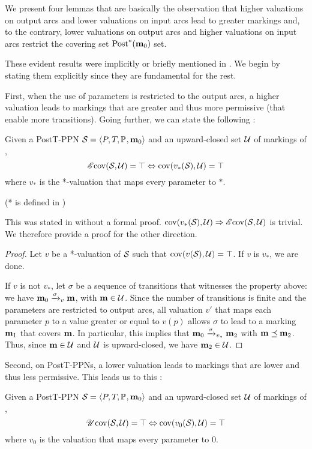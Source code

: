 
We present four lemmas that are basically the observation that
higher valuations on output arcs and lower valuations on input arcs lead to greater markings and, to the contrary,
lower valuations on output arcs and higher valuations on input arcs restrict the covering set $\operatorname{Post}^*_{{}}(\mathbf{m}_0)$ set.

These evident results were implicitly or briefly mentioned in \cite{David17}.
We begin by stating them explicitly since they are fundamental for the rest.

First, when the use of parameters is restricted to the output arcs, a higher valuation leads to markings that are greater and thus more permissive (\ie that enable more transitions).
Going further, we can state the following :
\begin{lemm}
  \label{theo:post-e-star-val}
  Given a PostT-\ac{PPN} $\defPPN$ and an upward-closed set $\mathcal{U}$ of markings of \namePPN, \[\operatorname{\mathscr{E}cov}(\mathcal{S}_{{}}, \mathcal{U}) = \top \Leftrightarrow \operatorname{cov}(v_*(\mathcal{S}_{{}}),\mathcal{U}) = \top\] where $v_*$ is the *-valuation that maps every parameter to $*$.
\end{lemm}

(* is defined in )

This was stated in \cite{David17} without a formal proof.
$\operatorname{cov}(v_*(\mathcal{S}_{{}}),\mathcal{U}) \Rightarrow \operatorname{\mathscr{E}cov}(\mathcal{S}_{{}}, \mathcal{U})$ is trivial.
We therefore provide a proof for the other direction.

\begin{proof}
  Let $v$ be a *-valuation of $\mathcal{S}_{{}}$ such that $\operatorname{cov}(v(\mathcal{S}_{{}}),\mathcal{U}) = \top$.
  If $v$ is $v_*$, we are done.

  If $v$ is not $v_*$, let $\sigma$ be a sequence of transitions that witnesses the property above: we have $\mari \fire[\val]{\sigma} \mar$, with $\mathbf{m} \in \mathcal{U}$.
  Since the number of transitions is finite and the parameters are restricted to output arcs, all valuation $v'$ that maps each parameter $p$ to a value greater or equal to $v(p)$ allows $\sigma$ to lead to a marking $\mathbf{m}_1$ that covers $\mathbf{m}$.
  In particular, this implies that $\mari \fire[\val_*]{\sigma} \mar_2$ with $\mathbf{m} \preceq \mathbf{m}_2$.
  Thus, since $\mathbf{m} \in \mathcal{U}$ and $\mathcal{U}$ is upward-closed, we have $\mathbf{m}_2 \in \mathcal{U}$.
\end{proof}

Second, on PostT-\acp{PPN}, a lower valuation leads to markings that are lower and thus less permissive.
This leads us to this :
\begin{lemm}
  \label{theo:post-u-zero-val}
  Given a PostT-\ac{PPN} $\defPPN$ and an upward-closed set $\mathcal{U}$ of markings of \namePPN, \[\operatorname{\mathscr{U}cov}(\mathcal{S}_{{}}, \mathcal{U}) = \top \Leftrightarrow \operatorname{cov}(v_0(\mathcal{S}_{{}}),\mathcal{U}) = \top\] where $v_0$ is the valuation that maps every parameter to $0$.
\end{lemm}

